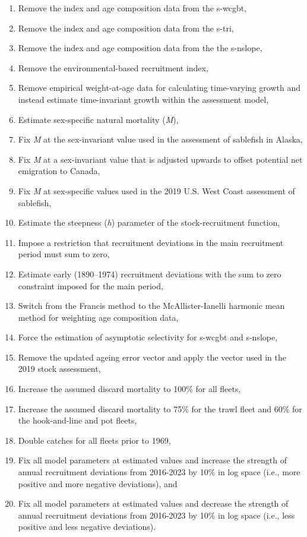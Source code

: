 \documentclass[
  english,
]{article}
\begin{document}
\begin{enumerate}
\def\labelenumi{\arabic{enumi}.}
\item
  Remove the index and age composition data from the \gls{s-wcgbt},
\item
  Remove the index and age composition data from the \gls{s-tri},
\item
  Remove the index and age composition data from the the \gls{s-nslope},
\item
  Remove the environmental-based recruitment index,
\item
  Remove empirical weight-at-age data for calculating time-varying
  growth and instead estimate time-invariant growth within the
  assessment model,
\item
  Estimate sex-specific natural mortality (\emph{M}),
\item
  Fix \emph{M} at the sex-invariant value used in the assessment of
  sablefish in Alaska,
\item
  Fix \emph{M} at a sex-invariant value that is adjusted upwards to
  offset potential net emigration to Canada,
\item
  Fix \emph{M} at sex-specific values used in the 2019 U.S. West Coast
  assessment of sablefish,
\item
  Estimate the steepness (\emph{h}) parameter of the stock-recruitment
  function,
\item
  Impose a restriction that recruitment deviations in the main
  recruitment period must sum to zero,
\item
  Estimate early (1890--1974) recruitment deviations with the sum to
  zero constraint imposed for the main period,
\item
  Switch from the Francis method to the McAllister-Ianelli harmonic mean
  method for weighting age composition data,
\item
  Force the estimation of asymptotic selectivity for \gls{s-wcgbt} and
  \gls{s-nslope},
\item
  Remove the updated ageing error vector and apply the vector used in
  the 2019 stock assessment,
\item
  Increase the assumed discard mortality to 100\% for all fleets,
\item
  Increase the assumed discard mortality to 75\% for the trawl fleet and
  60\% for the hook-and-line and pot fleets,
\item
  Double catches for all fleets prior to 1969,
\item
  Fix all model parameters at estimated values and increase the strength
  of annual recruitment deviations from 2016-2023 by 10\% in log space
  (i.e., more positive and more negative deviations), and
\item
  Fix all model parameters at estimated values and decrease the strength
  of annual recruitment deviations from 2016-2023 by 10\% in log space
  (i.e., less positive and less negative deviations).
\end{enumerate}
\end{document}
